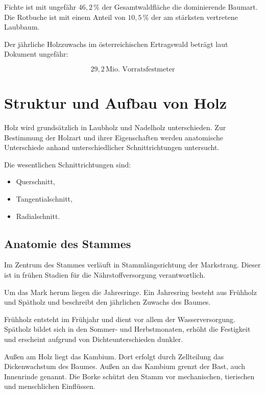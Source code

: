 \documentclass[
  12pt,
  a4paper,
  oneside
]{scrreprt}
\begin{document}
Fichte ist mit ungefähr $46{,}2\,\%$ der Gesamtwaldfläche die
dominierende Baumart. Die Rotbuche ist mit einem Anteil von
$10{,}5\,\%$ der am stärksten vertretene Laubbaum.


Der jährliche Holzzuwachs im österreichischen Ertragswald beträgt laut
Dokument ungefähr:

\begin{equation}
  29{,}2\,\text{Mio.\ Vorratsfestmeter}
\end{equation}



\section{Struktur und Aufbau von Holz}

Holz wird grundsätzlich in Laubholz und Nadelholz unterschieden. Zur
Bestimmung der Holzart und ihrer Eigenschaften werden anatomische
Unterschiede anhand unterschiedlicher Schnittrichtungen untersucht.


Die wesentlichen Schnittrichtungen sind:

\begin{itemize}
  \item Querschnitt,
  \item Tangentialschnitt,
  \item Radialschnitt.
\end{itemize}



\subsection{Anatomie des Stammes}

Im Zentrum des Stammes verläuft in Stammlängsrichtung der Markstrang.
Dieser ist in frühen Stadien für die Nährstoffversorgung verantwortlich.


Um das Mark herum liegen die Jahresringe. Ein Jahresring besteht aus
Frühholz und Spätholz und beschreibt den jährlichen Zuwachs des
Baumes. 

Frühholz entsteht im Frühjahr und dient vor allem der Wasserversorgung.
Spätholz bildet sich in den Sommer- und Herbstmonaten, erhöht die
Festigkeit und erscheint aufgrund von Dichteunterschieden dunkler.


Außen am Holz liegt das Kambium. Dort erfolgt durch Zellteilung das
Dickenwachstum des Baumes. Außen an das Kambium grenzt der Bast, auch
Innenrinde genannt. Die Borke schützt den Stamm vor mechanischen,
tierischen und menschlichen Einflüssen. 
\end{document}
